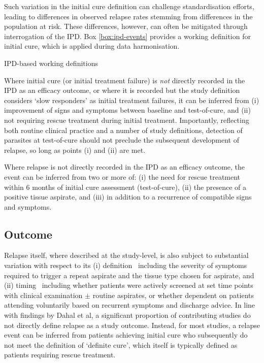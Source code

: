 Such variation in the initial cure definition can challenge standardisation efforts, leading to differences in observed relapse rates stemming from differences in the population at risk. These differences, however, can often be mitigated through interrogation of the IPD. Box \ref{box:ipd-events} provides a working definition for initial cure, which is applied during data harmonisation.

\begin{mybox}[floatplacement=tb, label=box:ipd-events]{IPD-based working definitions}
  \begin{description}[nosep]
    \item[\textbf{Initial cure}] Where initial cure (or initial treatment failure) is \textit{not} directly recorded in the IPD as an efficacy outcome, or where it is recorded but the study definition considers `slow responders' as initial treatment failures, it can be inferred from (i) improvement of signs and symptoms between baseline and test-of-cure, and (ii) not requiring rescue treatment during initial treatment. Importantly, reflecting both routine clinical practice and a number of study definitions, detection of parasites at test-of-cure should not preclude the subsequent development of relapse, so long as points (i) and (ii) are met.
  \end{description}
  \tcbline
  \begin{description}[nosep]
    \item[\textbf{Relapse}] Where relapse is not directly recorded in the IPD as an efficacy outcome, the event can be inferred from two or more of: (i) the need for rescue treatment within 6 months of initial cure assessment (test-of-cure), (ii) the presence of a positive tissue aspirate, and (iii) in addition to a recurrence of compatible signs and symptoms.
  \end{description}
\end{mybox}

\subsection{\label{sec:methods-outcome}Outcome}

Relapse itself, where described at the study-level, is also subject to substantial variation with respect to its (i) definition \textemdash\ including the severity of symptoms required to trigger a repeat aspirate and the tissue type chosen for aspirate, and (ii) timing \textemdash\ including whether patients were actively screened at set time points with clinical examination $\pm$ routine aspirates, or whether dependent on patients attending voluntarily based on recurrent symptoms and discharge advice. In line with findings by Dahal et al, a significant proportion of contributing studies do not directly define relapse as a study outcome\cite{dahal2024}. Instead, for most studies, a relapse event can be inferred from patients achieving initial cure who subsequently do not meet the definition of `definite cure', which itself is typically defined as patients requiring rescue treatment.


